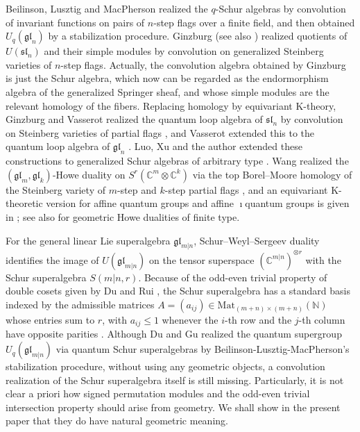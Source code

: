 \documentclass[11pt,a4paper]{amsart}
\theoremstyle{definition}
\theoremstyle{remark}
\newcommand{\C}{\mathbb C}
\numberwithin{equation}{section}
\begin{document}
Beilinson, Lusztig and MacPherson \cite{BLM} realized the $q$-Schur algebras by
convolution of invariant functions on pairs of $n$-step flags over a finite
field, and then obtained $U_q(\mathfrak{gl}_n)$ by a stabilization
procedure. Ginzburg \cite{Gin91} (see also \cite{CG}) realized
quotients of $U(\mathfrak{sl}_n)$ and their simple modules by convolution on generalized Steinberg varieties of $n$-step flags. Actually, the convolution algebra obtained by Ginzburg is just the Schur algebra, which now can be regarded as the endormorphism algebra of the generalized Springer sheaf, and whose simple modules are the relevant homology of the fibers. Replacing homology by equivariant \mbox{K-theory}, Ginzburg and Vasserot realized the quantum loop algebra of $\mathfrak{sl}_n$ by convolution on Steinberg varieties of partial flags \cite{GV93}, and Vasserot extended this to the quantum loop algebra of $\mathfrak{gl}_n$ \cite{Vas98}. Luo, Xu and the author extended these constructions to generalized Schur algebras of arbitrary type \cite{LXY}. Wang realized the $(\mathfrak{gl}_m,\mathfrak{gl}_k)$-Howe duality on
$S^r(\C^m\otimes\C^k)$ via the top Borel--Moore homology of the Steinberg
variety of $m$-step and $k$-step partial flags \cite{Wan01}, and an equivariant K-theoretic version for affine quantum groups and affine $\imath$quantum groups is given in
\cite[Section~7.4]{LXY}; see also \cite{LX22} for geometric Howe
dualities of finite type.

For the general linear Lie superalgebra $\mathfrak{gl}_{m|n}$,
Schur--Weyl--Sergeev duality \cite{Ser,BR} identifies the image of
$U(\mathfrak{gl}_{m|n})$ on the tensor superspace $(\mathbb{C}^{m|n})^{\otimes r}$ with the Schur superalgebra $S(m|n,r)$. 
Because of the odd-even trivial property of double cosets given by Du and Rui \cite[Lemma~3.1 and Proposition~3.2]{DuRui}, the Schur superalgebra has a standard basis indexed by the admissible matrices $A=(a_{ij})\in\mathrm{Mat}_{(m+n)\times (m+n)}(\mathbb{N})$ whose entries sum to $r$, with $a_{ij}\le1$ whenever the $i$-th row and the $j$-th column have opposite parities \cite[Theorem~5.8]{DuRui}. Although Du and Gu \cite{DuGu} realized the quantum supergroup $U_q(\mathfrak{gl}_{m|n})$  via quantum Schur superalgebras by Beilinson-Lusztig-MacPherson's stabilization procedure, without using any geometric objects, a convolution realization of the Schur superalgebra itself is still missing. Particularly, it is not clear a priori how signed permutation modules and the odd-even trivial intersection property should arise from geometry. We shall show in the present paper that they do have natural geometric meaning.
\end{document}

